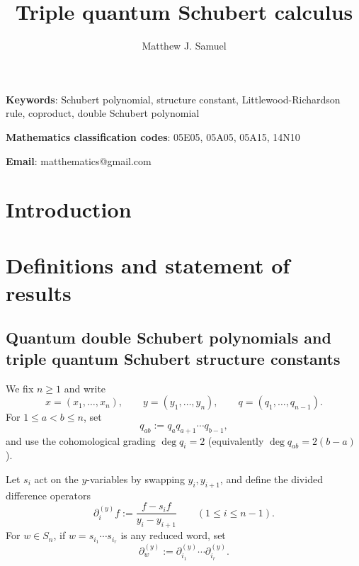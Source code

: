 \documentclass{amsart}
\title{Triple quantum Schubert calculus}
\author{Matthew J. Samuel}
\newtheorem{theorem}[lemma]{Theorem}
\theoremstyle{definition}
\theoremstyle{remark}
\numberwithin{equation}{section}
\DeclareMathOperator{\sch}{\mathfrak{S}}
\newcommand{\xrightsquigarrow}[2][]{%
	\mathrel{\mathop{\rightsquigarrow}\limits^{\scriptstyle #2}%
	\ifx\hfuzz#1\hfuzz\else_{\scriptstyle #1}\fi}%
}
\newcommand{\tom}[1]{\ensuremath{\xrightsquigarrow{#1}}}
\begin{document}
\begin{abstract}
\end{abstract}
\maketitle

{\bf Keywords}: Schubert polynomial, structure constant, Littlewood-Richardson rule, coproduct, double Schubert polynomial

{\bf Mathematics classification codes}: 05E05, 05A05, 05A15, 14N10

{\bf Email}: matthematics@gmail.com

\newcommand{\code}{\mathfrak{c}}
\newcommand{\ducode}{\overline{\mathfrak{c}}}
\newcommand{\wte}{\mathbf{E}}
\newcommand{\qelem}{\widetilde{E}}
\newcommand{\pcomp}[1]{\widehat{#1}}

\section{Introduction}



\section{Definitions and statement of results}

\subsection{Quantum double Schubert polynomials and triple quantum Schubert structure constants}
We fix $n\geq 1$ and write
$$x=(x_1,\ldots,x_n),\qquad y=(y_1,\ldots,y_n),\qquad q=(q_1,\ldots,q_{n-1}).$$
For $1\leq a<b\leq n$, set
$$q_{ab}:=q_aq_{a+1}\cdots q_{b-1},$$
and use the cohomological grading $\deg q_i=2$ (equivalently $\deg q_{ab}=2(b-a)$).

Let $s_i$ act on the $y$-variables by swapping $y_i,y_{i+1}$, and define the divided difference operators
$$\partial_i^{(y)}f:=\frac{f-s_i f}{y_i-y_{i+1}}\qquad(1\leq i\leq n-1).$$
For $w\in S_n$, if $w=s_{i_1}\cdots s_{i_r}$ is any reduced word, set
$$\partial_w^{(y)}:=\partial_{i_1}^{(y)}\cdots \partial_{i_r}^{(y)}.$$
\end{document}
